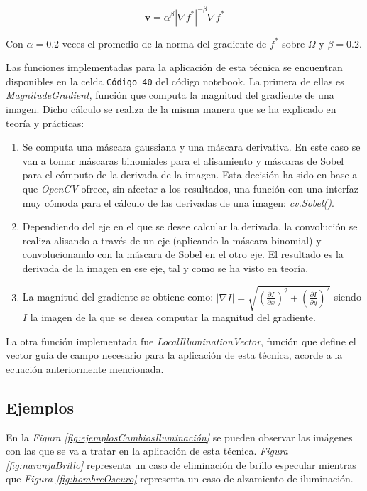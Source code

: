 \documentclass[11pt,twoside,titlepage,a4paper]{article}
\numberwithin{equation}{section} %
\theoremstyle{usual}
\begin{document}
\begin{equation}
    \boldsymbol{v} = \alpha^{\beta}|\nabla f^*|^{-\beta}\nabla f^*
\end{equation}

Con $\alpha = 0.2$ veces el promedio de la norma del gradiente de $f^*$ sobre $\Omega$ y $\beta=0.2$.

Las funciones implementadas para la aplicación de esta técnica se encuentran disponibles en la celda \texttt{Código 40} del código notebook. La primera de ellas es \textit{MagnitudeGradient}, función que computa la magnitud del gradiente de una imagen. Dicho cálculo se realiza de la misma manera que se ha explicado en teoría y prácticas:

\begin{enumerate}
    \item Se computa una máscara gaussiana y una máscara derivativa. En este caso se van a tomar máscaras binomiales para el alisamiento y máscaras de Sobel para el cómputo de la derivada de la imagen. Esta decisión ha sido en base a que \textit{OpenCV} ofrece, sin afectar a los resultados, una función con una interfaz muy cómoda para el cálculo de las derivadas de una imagen: \textit{cv.Sobel()}.
    \item Dependiendo del eje en el que se desee calcular la derivada, la convolución se realiza alisando a través de un eje (aplicando la máscara binomial) y convolucionando con la máscara de Sobel en el otro eje. El resultado es la derivada de la imagen en ese eje, tal y como se ha visto en teoría.
    \item La magnitud del gradiente se obtiene como: $|\nabla I| = \sqrt{(\frac{\partial I}{\partial x})^2 + (\frac{\partial I}{\partial y})^2}$ siendo $I$ la imagen de la que se desea computar la magnitud del gradiente.
\end{enumerate}

La otra función implementada fue \textit{LocalIlluminationVector}, función que define el vector guía de campo necesario para la aplicación de esta técnica, acorde a la ecuación anteriormente mencionada.

\subsection{Ejemplos}

En la \textit{Figura \ref{fig:ejemplosCambiosIluminación}} se pueden observar las imágenes con las que se va a tratar en la aplicación de esta técnica. \textit{Figura \ref{fig:naranjaBrillo}} representa un caso de eliminación de brillo especular mientras que \textit{Figura \ref{fig:hombreOscuro}} representa un caso de alzamiento de iluminación.
\end{document}
